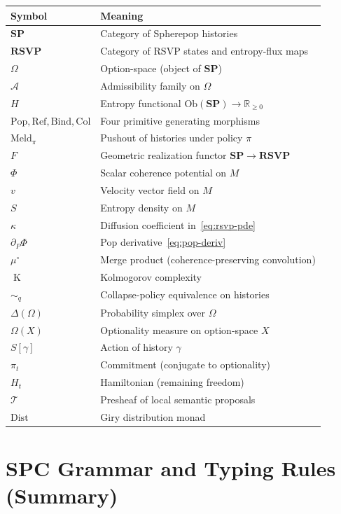 \documentclass[12pt, a4paper]{article}
\theoremstyle{definition}
\theoremstyle{remark}
\newcommand{\Ent}{H}
\newcommand{\Rnn}{\mathbb{R}_{\ge 0}}
\newcommand{\SP}{\mathbf{SP}}
\newcommand{\RSVP}{\mathbf{RSVP}}
\newcommand{\Pop}{\mathrm{Pop}}
\newcommand{\Refuse}{\mathrm{Ref}}
\newcommand{\Bind}{\mathrm{Bind}}
\newcommand{\Collapse}{\mathrm{Col}}
\newcommand{\Meld}{\mathrm{Meld}}
\newcommand{\Ob}{\mathrm{Ob}}
\DeclareMathOperator{\Kc}{K}
\begin{document}
\begin{center}
\renewcommand{\arraystretch}{1.4}
\begin{tabular}{ll}
\toprule
\textbf{Symbol} & \textbf{Meaning} \\
\midrule
$\SP$ & Category of Spherepop histories \\
$\RSVP$ & Category of RSVP states and entropy-flux maps \\
$\Omega$ & Option-space (object of $\SP$) \\
$\mathcal{A}$ & Admissibility family on $\Omega$ \\
$\Ent$ & Entropy functional $\Ob(\SP) \to \Rnn$ \\
$\Pop, \Refuse, \Bind, \Collapse$ & Four primitive generating morphisms \\
$\Meld_\pi$ & Pushout of histories under policy $\pi$ \\
$F$ & Geometric realization functor $\SP \to \RSVP$ \\
$\Phi$ & Scalar coherence potential on $M$ \\
$v$ & Velocity vector field on $M$ \\
$S$ & Entropy density on $M$ \\
$\kappa$ & Diffusion coefficient in~\eqref{eq:rsvp-pde} \\
$\partial_P \Phi$ & Pop derivative~\eqref{eq:pop-deriv} \\
$\mu^\circ$ & Merge product (coherence-preserving convolution) \\
$\Kc$ & Kolmogorov complexity \\
$\sim_q$ & Collapse-policy equivalence on histories \\
$\Delta(\Omega)$ & Probability simplex over $\Omega$ \\
$\Omega(X)$ & Optionality measure on option-space $X$ \\
$S[\gamma]$ & Action of history $\gamma$ \\
$\pi_t$ & Commitment (conjugate to optionality) \\
$H_t$ & Hamiltonian (remaining freedom) \\
$\mathcal{T}$ & Presheaf of local semantic proposals \\
$\mathrm{Dist}$ & Giry distribution monad \\
\bottomrule
\end{tabular}
\end{center}

\section{SPC Grammar and Typing Rules (Summary)}
\label{app:spc}
\end{document}
